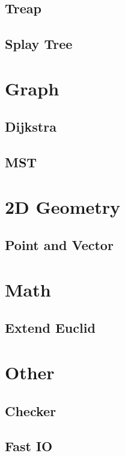 \documentclass[twoside]{article}
\begin{document}
		\subsection{Treap}
			
		\subsection{Splay Tree}
			
	\newpage
	\section{Graph}
		\subsection{Dijkstra}
		\subsection{MST}
	\newpage
	\section{2D Geometry}
		\subsection{Point and Vector}
	\newpage
	\section{Math}
		\subsection{Extend Euclid}
	\newpage
	\section{Other}
		\subsection{Checker}
			
		\subsection{Fast IO}
			
\end{document}
